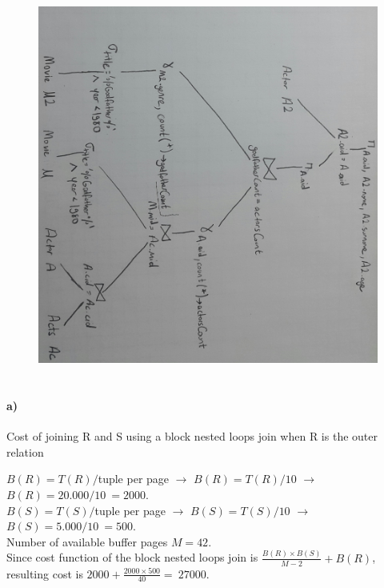 \documentclass[a4paper,12pt]{article}
\begin{document}
\begin{figure} [H]
    \centering
    \includegraphics[width=\linewidth]{3.b.jpg}
\end{figure}
\newpage

\section{}

\paragraph{a)} 
Cost of joining R and S using a block nested loops join when R is the outer relation
\begin{tcolorbox}
$B(R) = T(R)/$tuple per page $\rightarrow$ $B(R) = T(R)/10$ $\rightarrow$ $B(R) = 20.000/10\ = 2000$. \\
$B(S) = T(S)/$tuple per page $\rightarrow$ $B(S) = T(S)/10$ $\rightarrow$ $B(S) = 5.000/10\ = 500$.\\
Number of available buffer pages $M = 42$.\\
Since cost function of the block nested loops join is $\frac{B(R)\times B(S)}{M-2} + B(R)$,\\ resulting cost is $2000+\frac{2000\times 500}{40} =\ 27000$. 
\end{tcolorbox}
\end{document}
